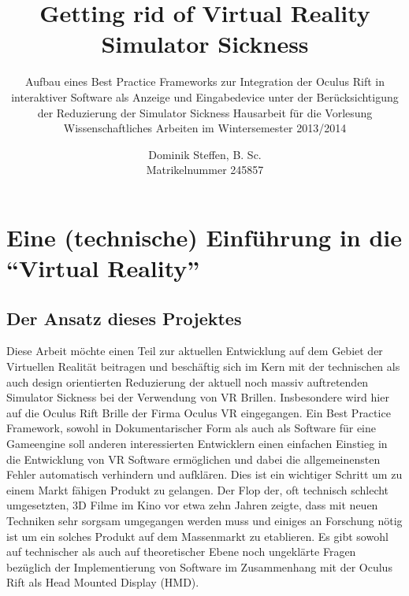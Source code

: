 \documentclass[pagesize, paper=a4, fontsize=12pt,titlepage=true, headings=small, headnosepline, abstractoff, liststotoc, nochapterprefix, plainheadsepline, twoside]{scrreprt}
\author{
Dominik Steffen, B. Sc.
\\
Matrikelnummer 245857
}
\title{Getting rid of Virtual Reality Simulator Sickness}
\subtitle{Aufbau eines Best Practice Frameworks zur Integration der Oculus Rift in interaktiver Software als Anzeige und Eingabedevice unter der Berücksichtigung der Reduzierung der Simulator Sickness
\newline
\newline
Hausarbeit für die Vorlesung Wissenschaftliches Arbeiten im Wintersemester 2013/2014
}
\begin{document}
\maketitle
%


\begingroup
	\renewcommand*{\chapterpagestyle}{empty}
	\tableofcontents
	\thispagestyle{empty}
\endgroup


\renewcommand*{\chapterpagestyle}{plain}
\pagestyle{plain}
\setcounter{page}{0}

\chapter{Eine (technische) Einführung in die "`Virtual Reality"'}

\section{Der Ansatz dieses Projektes}
Diese Arbeit möchte einen Teil zur aktuellen Entwicklung auf dem Gebiet der Virtuellen Realität beitragen und beschäftig sich im Kern mit der technischen als auch design orientierten Reduzierung der aktuell noch massiv auftretenden Simulator Sickness bei der Verwendung von VR Brillen. Insbesondere wird hier auf die Oculus Rift Brille der Firma Oculus VR eingegangen. Ein Best Practice Framework, sowohl in Dokumentarischer Form als auch als Software für eine Gameengine soll anderen interessierten Entwicklern einen einfachen Einstieg in die Entwicklung von VR Software ermöglichen und dabei die allgemeinensten Fehler automatisch verhindern und aufklären. Dies ist ein wichtiger Schritt um zu einem Markt fähigen Produkt zu gelangen. Der Flop der, oft technisch schlecht umgesetzten, 3D Filme im Kino vor etwa zehn Jahren zeigte, dass mit neuen Techniken sehr sorgsam umgegangen werden muss und einiges an Forschung nötig ist um ein solches Produkt auf dem Massenmarkt zu etablieren. Es gibt sowohl auf technischer als auch auf theoretischer Ebene noch ungeklärte Fragen bezüglich der Implementierung von Software im Zusammenhang mit der Oculus Rift als Head Mounted Display (HMD).
\end{document}
